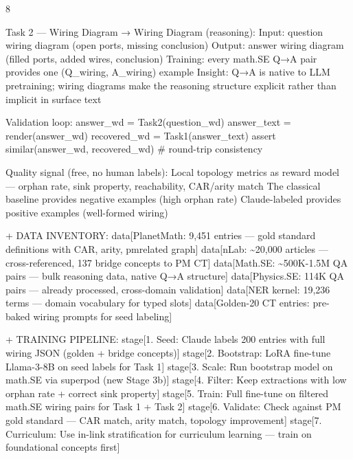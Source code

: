 \documentclass[landscape]{article}
\begin{document}
\begin{paracol}{8}
\par
    Task 2 — Wiring Diagram → Wiring Diagram (reasoning): Input: question wiring diagram (open ports, missing conclusion) Output: answer wiring diagram (filled ports, added wires, conclusion) Training: every math.SE Q→A pair provides one (Q\_wiring, A\_wiring) example Insight: Q→A is native to LLM pretraining; wiring diagrams make the reasoning structure explicit rather than implicit in surface text\\
\par
    Validation loop: answer\_wd = Task2(question\_wd) answer\_text = render(answer\_wd) recovered\_wd = Task1(answer\_text) assert similar(answer\_wd, recovered\_wd)  \# round-trip consistency\\
\par
    Quality signal (free, no human labels): Local topology metrics as reward model — orphan rate, sink property, reachability, CAR/arity match The classical baseline provides negative examples (high orphan rate) Claude-labeled provides positive examples (well-formed wiring)\\
\par
  + DATA INVENTORY: data[PlanetMath: 9,451 entries — gold standard definitions with CAR, arity, pmrelated graph] data[nLab: \textasciitilde{}20,000 articles — cross-referenced, 137 bridge concepts to PM CT] data[Math.SE: \textasciitilde{}500K-1.5M QA pairs — bulk reasoning data, native Q→A structure] data[Physics.SE: 114K QA pairs — already processed, cross-domain validation] data[NER kernel: 19,236 terms — domain vocabulary for typed slots] data[Golden-20 CT entries: pre-baked wiring prompts for seed labeling]\\
\par
  + TRAINING PIPELINE: stage[1. Seed: Claude labels 200 entries with full wiring JSON (golden + bridge concepts)] stage[2. Bootstrap: LoRA fine-tune Llama-3-8B on seed labels for Task 1] stage[3. Scale: Run bootstrap model on math.SE via superpod (new Stage 3b)] stage[4. Filter: Keep extractions with low orphan rate + correct sink property] stage[5. Train: Full fine-tune on filtered math.SE wiring pairs for Task 1 + Task 2] stage[6. Validate: Check against PM gold standard — CAR match, arity match, topology improvement] stage[7. Curriculum: Use in-link stratification for curriculum learning — train on foundational concepts first]\\

\end{paracol}
\end{document}
